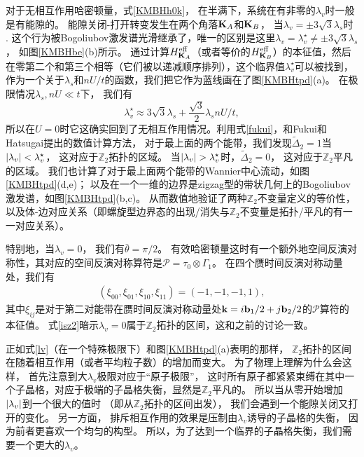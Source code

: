 对于无相互作用哈密顿量，式\eqref{KMBHh0k}，
在半满下，系统在有非零的$\lambda_v$时一般是有能隙的。
能隙关闭-打开转变发生在两个角落$\vb K_A$和$\vb K_B$，
当$\lambda_v=\pm 3\sqrt{3}\lambda_s$时 \cite{Kane2005}.
这个行为被Bogoliubov激发谱光滑继承了，唯一的区别是这里$\lambda_v=\lambda_v^\star\neq \pm 3\sqrt{3}\lambda_s$，
如图\ref{KMBHbe}(b)所示。
通过计算$H_{\vb K_A}^{\text{eff}}$（或者等价的$H_{\vb K_B}^{\text{eff}}$）的本征值，然后在零第二个和第三个相等（它们被以递减顺序排列），这个临界值$\lambda_v^\star$可以被找到，作为一个关于$\lambda_s$和$nU/t$的函数，我们把它作为蓝线画在了图\ref{KMBHtpd}(a)。
在极限情况$\lambda_s,nU\ll t$下，
我们有
\begin{equation}\label{lv}
	\lambda_v^\star \approx 3\sqrt{3}\lambda _s+\frac{\sqrt{3}}{2}\lambda _s nU/t,
\end{equation}
所以在$U=0$时它这确实回到了无相互作用情况。利用式\eqref{fukui}，和Fukui和Hatsugai\cite{Fukui2007}提出的数值计算方法，
对于最上面的两个能带，我们发现$\tilde \Delta_2=1$当$\abs{\lambda_v}<\lambda_v^\star$，
这对应于$\mathbb Z_2$拓扑的区域。
当$\abs{\lambda_v}>\lambda_v^\star$时，$\tilde \Delta_2=0$，
这对应于$\mathbb Z_2$平凡的区域。
我们也计算了对于最上面两个能带的Wannier中心流动，如图\ref{KMBHtpd}(d,e)；
以及在一个一维的边界是zigzag型的带状几何上的Bogoliubov激发谱，如图\ref{KMBHtpd}(b,c)。
从而数值地验证了两种$\mathbb Z_2$不变量定义的等价性，
以及体-边对应关系（即螺旋型边界态的出现/消失与$\mathbb Z_2$不变量是拓扑/平凡的有一一对应关系）。

特别地，当$\lambda_v=0$，
我们有$\bar \theta = \pi/2$。
有效哈密顿量这时有一个额外地空间反演对称性，其对应的空间反演对称算符是$\mathcal P=\tau_0\otimes\Gamma_1$。
在四个赝时间反演对称动量处，我们有
\begin{equation*}
	\begin{split}
		(\xi_{00},\xi_{01},\xi_{10},\xi_{11})=(-1,-1,-1,1),
	\end{split}
\end{equation*}
其中$\xi_{ij}$是对于第二对能带在赝时间反演对称动量处$\vb k = i \vb b_1/2 +j \vb b_2/2$的$\mathcal P$算符的本征值。
式\eqref{isz2}暗示$\lambda_v=0$属于$\mathbb Z_2$拓扑的区间，这和之前的讨论一致。

正如式\eqref{lv}（在一个特殊极限下）和图\ref{KMBHtpd}(a)表明的那样，
$\mathbb Z_2$拓扑的区间在随着相互作用（或者平均粒子数）的增加而变大。
为了物理上理解为什么会这样，
首先注意到大$\lambda_v$极限对应于“原子极限”\cite{Bernevig2013}，
这时所有原子都紧紧束缚在其中一个子晶格，对应于极端的子晶格失衡，显然是$\mathbb Z_2$平凡的。
所以当从零开始增加$\abs{\lambda_v}$到一个很大的值时
（即从$\mathbb Z_2$拓扑的区间出发），
我们会遇到一个能隙关闭又打开的变化。
另一方面，
排斥相互作用的效果是压制由$\lambda_v$诱导的子晶格的失衡，
因为前者更喜欢一个均匀的构型。
所以，为了达到一个临界的子晶格失衡，我们需要一个更大的$\lambda_v$。

